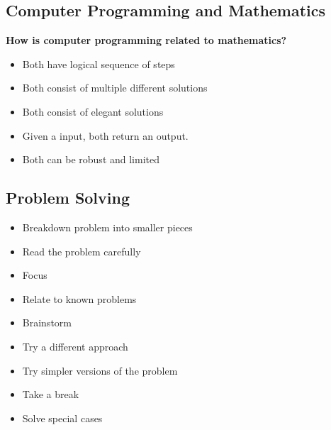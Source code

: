 \documentclass{article}
\begin{document}
\subsection{Computer Programming and Mathematics}
\textbf{How is computer programming related to mathematics?}
\begin{itemize}
\item Both have logical sequence of steps 
\item Both consist of multiple different solutions
\item Both consist of elegant solutions
\item Given a input, both return an output. 
\item Both can be robust and limited
\end{itemize}

\subsection{Problem Solving}
\begin{itemize}
\item Breakdown problem into smaller pieces 
\item Read the problem carefully 
\item Focus
\item Relate to known problems
\item Brainstorm 
\item Try a different approach 
\item Try simpler versions of the problem 
\item Take a break 
\item Solve special cases
\end{itemize}
\end{document}
